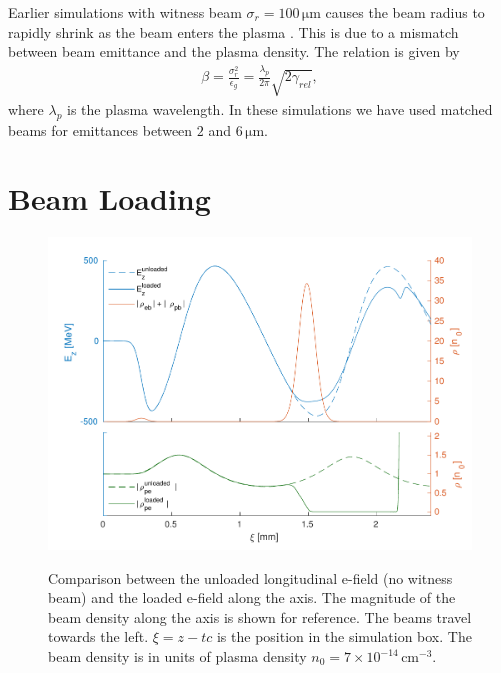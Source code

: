 \documentclass[aps,prstab,reprint,amsmath,amssymb,groupedaddress]{revtex4-1}
\newcommand{\unit}[1]{\,\mathrm{#1}}
\newcommand{\nexp}[1]{\times 10^{#1}}
\begin{document}
Earlier simulations with witness beam $\sigma_{r} = 100\unit{\mu m}$ causes the beam radius to rapidly shrink as the
beam enters the plasma \cite{berglyd_olsen:2016}. This is due to a mismatch between beam emittance and the plasma
density. The relation is given by
\begin{align}
    \beta = \frac{\sigma_r^2}{\epsilon_g} = \frac{\lambda_p}{2\pi}\sqrt{2\gamma_{rel}}, \label{EQ:Matched}
\end{align}
where $\lambda_{p}$ is the plasma wavelength. In these simulations we have used matched beams for emittances between
$2$ and $6\unit{\mu m}$.

\section[\label{S:BL}]{Beam Loading}

\begin{figure}[hbt]
    \includegraphics[width=0.99\linewidth,trim={4mm 0mm 4mm 0mm},clip]{figures/beamLoading}
    \label{Fig:BeamLoading}
    \caption{Comparison between the unloaded longitudinal e-field (no witness beam) and the loaded e-field along the
        axis. The magnitude of the beam density along the axis is shown for reference. The beams travel towards the
        left. $\xi = z - tc$ is the position in the simulation box. The beam density is in units of plasma density
        $n_{0} = 7\nexp{-14}\unit{cm}^{-3}$.}
\end{figure}
\end{document}
